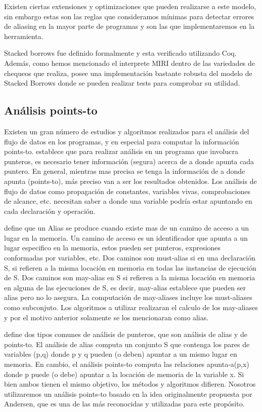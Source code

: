 Existen ciertas extensiones y optimizaciones que pueden realizarse a este modelo, sin embargo estas son las reglas que consideramos mínimas para detectar errores de aliasing en la mayor parte de programas y son las que implementaremos en la herramienta.

Stacked borrows fue definido formalmente y esta verificado utilizando Coq. Además, como hemos mencionado el interprete MIRI \cite{miri} dentro de las variedades de chequeos que realiza, posee una implementación bastante robusta del modelo de Stacked Borrows donde se pueden realizar tests para comprobar su utilidad.

\subsection{Análisis points-to}

Existen un gran número de estudios y algoritmos realizados para el análisis del flujo de datos en los programas, y en especial para computar la información points-to. \cite{fastaliasinganalisis} establece que para realizar análisis en un programa que involucra punteros, es necesario tener información (segura) acerca de a donde apunta cada puntero. En general, mientras mas precisa se tenga la información de a donde apunta (points-to), más preciso van a ser los resultados obtenidos. Los análisis de flujo de datos como propagación de constantes, variables vivas, comprobaciones de alcance, etc. necesitan saber a donde una variable podría estar apuntando en cada declaración y operación.

\cite{interprocedural} define que un Alias se produce cuando existe mas de un camino de acceso a un lugar en la memoria. Un camino de acceso es un identificador que apunta a un lugar especifico en la memoria, estos pueden ser punteros, expresiones conformadas por variables, etc. Dos caminos son must-alias si en una declaración S, si refieren a la misma locación en memoria en todas las instancias de ejecución de S. Dos caminos son may-alias en S si refieren a la misma locación en memoria en alguna de las ejecuciones de S, es decir, may-alias establece que pueden ser alias pero no lo asegura. La computación de may-aliases incluye los must-aliases como subconjuto. Los algoritmos a utilizar realizaran el calculo de los may-aliases y por el motivo anterior solamente se los mencionaran como alias.

\cite{pointeranalysis} define dos tipos comunes de análisis de punteros, que son análisis de alias y de points-to.
El análisis de alias computa un conjunto S que contenga los pares de variables (p,q) donde p y q pueden (o deben) apuntar a un mismo lugar en memoria. En cambio, el análisis points-to computa las relaciones apunta-a(p,x) donde p puede (o debe) apuntar a la locación de memoria de la variable x. Si bien ambos tienen el mismo objetivo, los métodos y algoritmos difieren. Nosotros utilizaremos un análisis points-to basado en la idea originalmente propuesta por Andersen, que es una de las más reconocidas y utilizadas para este propósito.

